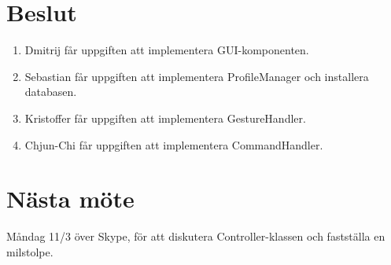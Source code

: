 \documentclass[a4paper,12pt]{article}
\begin{document}
\section{Beslut}
\begin{enumerate}
\item Dmitrij får uppgiften att implementera GUI-komponenten.
\item Sebastian får uppgiften att implementera ProfileManager och installera databasen.
\item Kristoffer får uppgiften att implementera GestureHandler.
\item Chjun-Chi får uppgiften att implementera CommandHandler.
\end{enumerate}

\section{Nästa möte}
Måndag 11/3 över Skype, för att diskutera Controller-klassen och fastställa en milstolpe.
\end{document}

